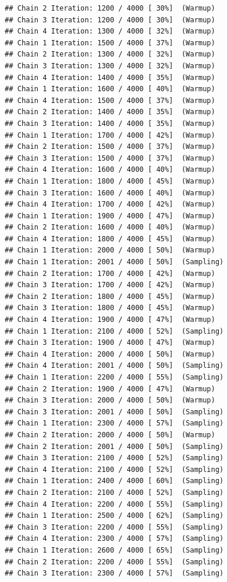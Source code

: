 \documentclass[
]{article}
\begin{document}
\begin{verbatim}
## Chain 2 Iteration: 1200 / 4000 [ 30%]  (Warmup) 
## Chain 3 Iteration: 1200 / 4000 [ 30%]  (Warmup) 
## Chain 4 Iteration: 1300 / 4000 [ 32%]  (Warmup) 
## Chain 1 Iteration: 1500 / 4000 [ 37%]  (Warmup) 
## Chain 2 Iteration: 1300 / 4000 [ 32%]  (Warmup) 
## Chain 3 Iteration: 1300 / 4000 [ 32%]  (Warmup) 
## Chain 4 Iteration: 1400 / 4000 [ 35%]  (Warmup) 
## Chain 1 Iteration: 1600 / 4000 [ 40%]  (Warmup) 
## Chain 4 Iteration: 1500 / 4000 [ 37%]  (Warmup) 
## Chain 2 Iteration: 1400 / 4000 [ 35%]  (Warmup) 
## Chain 3 Iteration: 1400 / 4000 [ 35%]  (Warmup) 
## Chain 1 Iteration: 1700 / 4000 [ 42%]  (Warmup) 
## Chain 2 Iteration: 1500 / 4000 [ 37%]  (Warmup) 
## Chain 3 Iteration: 1500 / 4000 [ 37%]  (Warmup) 
## Chain 4 Iteration: 1600 / 4000 [ 40%]  (Warmup) 
## Chain 1 Iteration: 1800 / 4000 [ 45%]  (Warmup) 
## Chain 3 Iteration: 1600 / 4000 [ 40%]  (Warmup) 
## Chain 4 Iteration: 1700 / 4000 [ 42%]  (Warmup) 
## Chain 1 Iteration: 1900 / 4000 [ 47%]  (Warmup) 
## Chain 2 Iteration: 1600 / 4000 [ 40%]  (Warmup) 
## Chain 4 Iteration: 1800 / 4000 [ 45%]  (Warmup) 
## Chain 1 Iteration: 2000 / 4000 [ 50%]  (Warmup) 
## Chain 1 Iteration: 2001 / 4000 [ 50%]  (Sampling) 
## Chain 2 Iteration: 1700 / 4000 [ 42%]  (Warmup) 
## Chain 3 Iteration: 1700 / 4000 [ 42%]  (Warmup) 
## Chain 2 Iteration: 1800 / 4000 [ 45%]  (Warmup) 
## Chain 3 Iteration: 1800 / 4000 [ 45%]  (Warmup) 
## Chain 4 Iteration: 1900 / 4000 [ 47%]  (Warmup) 
## Chain 1 Iteration: 2100 / 4000 [ 52%]  (Sampling) 
## Chain 3 Iteration: 1900 / 4000 [ 47%]  (Warmup) 
## Chain 4 Iteration: 2000 / 4000 [ 50%]  (Warmup) 
## Chain 4 Iteration: 2001 / 4000 [ 50%]  (Sampling) 
## Chain 1 Iteration: 2200 / 4000 [ 55%]  (Sampling) 
## Chain 2 Iteration: 1900 / 4000 [ 47%]  (Warmup) 
## Chain 3 Iteration: 2000 / 4000 [ 50%]  (Warmup) 
## Chain 3 Iteration: 2001 / 4000 [ 50%]  (Sampling) 
## Chain 1 Iteration: 2300 / 4000 [ 57%]  (Sampling) 
## Chain 2 Iteration: 2000 / 4000 [ 50%]  (Warmup) 
## Chain 2 Iteration: 2001 / 4000 [ 50%]  (Sampling) 
## Chain 3 Iteration: 2100 / 4000 [ 52%]  (Sampling) 
## Chain 4 Iteration: 2100 / 4000 [ 52%]  (Sampling) 
## Chain 1 Iteration: 2400 / 4000 [ 60%]  (Sampling) 
## Chain 2 Iteration: 2100 / 4000 [ 52%]  (Sampling) 
## Chain 4 Iteration: 2200 / 4000 [ 55%]  (Sampling) 
## Chain 1 Iteration: 2500 / 4000 [ 62%]  (Sampling) 
## Chain 3 Iteration: 2200 / 4000 [ 55%]  (Sampling) 
## Chain 4 Iteration: 2300 / 4000 [ 57%]  (Sampling) 
## Chain 1 Iteration: 2600 / 4000 [ 65%]  (Sampling) 
## Chain 2 Iteration: 2200 / 4000 [ 55%]  (Sampling) 
## Chain 3 Iteration: 2300 / 4000 [ 57%]  (Sampling) 

\end{verbatim}
\end{document}
